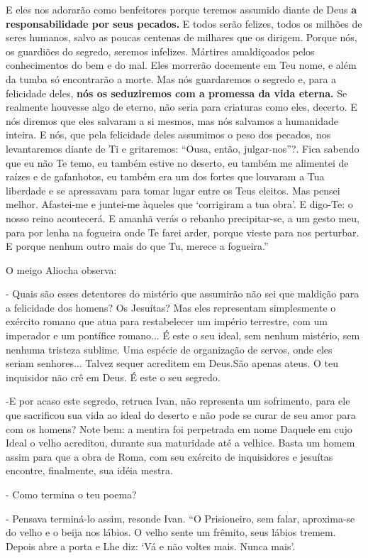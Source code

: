 E eles nos adorarão como benfeitores porque teremos assumido diante de
Deus \textbf{a responsabilidade por seus pecados.} E todos serão
felizes, todos os milhões de seres humanos, salvo as poucas centenas de
milhares que os dirigem. Porque nós, os guardiões do segredo, seremos
infelizes. Mártires amaldiçoados pelos conhecimentos do bem e do mal.
Eles morrerão docemente em Teu nome, e além da tumba só encontrarão a
morte. Mas nós guardaremos o segredo e, para a felicidade deles,
\textbf{nós os seduziremos com a promessa da vida eterna.} Se realmente
houvesse algo de eterno, não seria para criaturas como eles, decerto. E
nós diremos que eles salvaram a si mesmos, mas nós salvamos a humanidade
inteira. E nós, que pela felicidade deles assumimos o peso dos pecados,
nos levantaremos diante de Ti e gritaremos: ``Ousa, então,
julgar-nos''?. Fica sabendo que eu não Te temo, eu também estive no
deserto, eu também me alimentei de raízes e de gafanhotos, eu também era
um dos fortes que louvaram a Tua liberdade e se apressavam para tomar
lugar entre os Teus eleitos. Mas pensei melhor. Afastei-me e juntei-me
àqueles que `corrigiram a tua obra'. E digo-Te: o nosso reino
acontecerá. E amanhã verás o rebanho precipitar-se, a um gesto meu, para
por lenha na fogueira onde Te farei arder, porque vieste para nos
perturbar. E porque nenhum outro mais do que Tu, merece a fogueira.''

O meigo Aliocha observa:

- Quais são esses detentores do mistério que assumirão não sei que
maldição para a felicidade dos homens? Os Jesuítas? Mas eles representam
simplesmente o exército romano que atua para restabelecer um império
terrestre, com um imperador e um pontífice romano... É este o seu ideal,
sem nenhum mistério, sem nenhuma tristeza sublime. Uma espécie de
organização de servos, onde eles seriam senhores... Talvez sequer
acreditem em Deus.São apenas ateus. O teu inquisidor não crê em Deus. É
este o seu segredo.

-E por acaso este segredo, retruca Ivan, não representa um sofrimento,
para ele que sacrificou sua vida ao ideal do deserto e não pode se curar
de seu amor para com os homens? Note bem: a mentira foi perpetrada em
nome Daquele em cujo Ideal o velho acreditou, durante sua maturidade até
a velhice. Basta um homem assim para que a obra de Roma, com seu
exército de inquisidores e jesuítas encontre, finalmente, sua idéia
mestra.

- Como termina o teu poema?

- Pensava terminá-lo assim, resonde Ivan. ``O Prisioneiro, sem falar,
aproxima-se do velho e o beija nos lábios. O velho sente um frêmito,
seus lábios tremem. Depois abre a porta e Lhe diz: `Vá e não voltes
mais. Nunca mais'.

